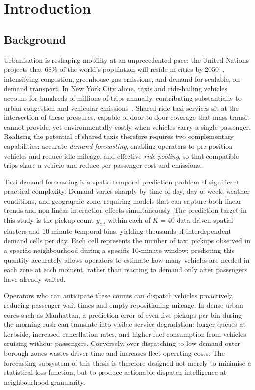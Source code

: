 \chapter{Introduction}
\label{ch:introduction}

\section{Background}

Urbanisation is reshaping mobility at an unprecedented pace: the United Nations projects that 68\% of the world's population will reside in cities by 2050~\parencite{un2018wup}, intensifying congestion, greenhouse gas emissions, and demand for scalable, on-demand transport. In New York City alone, taxis and ride-hailing vehicles account for hundreds of millions of trips annually, contributing substantially to urban congestion and vehicular emissions~\parencite{taxinyc_dataset}. Shared-ride taxi services sit at the intersection of these pressures, capable of door-to-door coverage that mass transit cannot provide, yet environmentally costly when vehicles carry a single passenger. Realising the potential of shared taxis therefore requires two complementary capabilities: accurate \emph{demand forecasting}, enabling operators to pre-position vehicles and reduce idle mileage, and effective \emph{ride pooling}, so that compatible trips share a vehicle and reduce per-passenger cost and emissions.

Taxi demand forecasting is a spatio-temporal prediction problem of significant practical complexity. Demand varies sharply by time of day, day of week, weather conditions, and geographic zone, requiring models that can capture both linear trends and non-linear interaction effects simultaneously. The prediction target in this study is the pickup count $y_{c,t}$ within each of $K{=}40$ data-driven spatial clusters and 10-minute temporal bins, yielding thousands of interdependent demand cells per day. Each cell represents the number of taxi pickups observed in a specific neighbourhood during a specific 10-minute window; predicting this quantity accurately allows operators to estimate how many vehicles are needed in each zone at each moment, rather than reacting to demand only after passengers have already waited.

Operators who can anticipate these counts can dispatch vehicles proactively, reducing passenger wait times and empty repositioning mileage. In dense urban cores such as Manhattan, a prediction error of even five pickups per bin during the morning rush can translate into visible service degradation: longer queues at kerbside, increased cancellation rates, and higher fuel consumption from vehicles cruising without passengers. Conversely, over-dispatching to low-demand outer-borough zones wastes driver time and increases fleet operating costs. The forecasting subsystem of this thesis is therefore designed not merely to minimise a statistical loss function, but to produce actionable dispatch intelligence at neighbourhood granularity.

